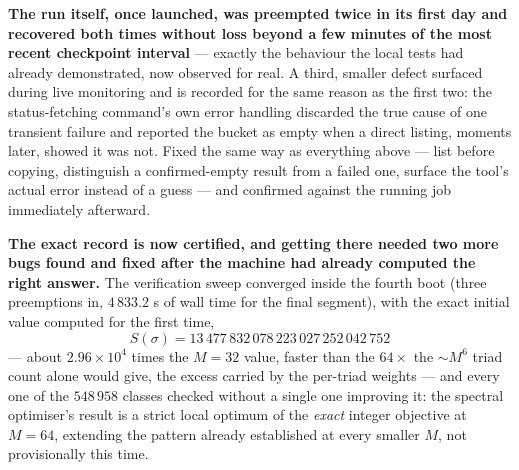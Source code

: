 \documentclass[11pt,a4paper]{article}
\theoremstyle{definition}
\theoremstyle{plain}
\begin{document}
\textbf{The run itself, once launched, was preempted twice in its first day and recovered both
times without loss beyond a few minutes of the most recent checkpoint interval} --- exactly the
behaviour the local tests had already demonstrated, now observed for real. A third, smaller
defect surfaced during live monitoring and is recorded for the same reason as the first two: the
status-fetching command's own error handling discarded the true cause of one transient failure and
reported the bucket as empty when a direct listing, moments later, showed it was not. Fixed the
same way as everything above --- list before copying, distinguish a confirmed-empty result from a
failed one, surface the tool's actual error instead of a guess --- and confirmed against the
running job immediately afterward.

\textbf{The exact record is now certified, and getting there needed two more bugs found and
fixed after the machine had already computed the right answer.} The verification sweep
converged inside the fourth boot (three preemptions in, $4\,833.2$ s of wall time for the final
segment), with the exact initial value computed for the first time,
\[
  S(\sigma) = 13\,477\,832\,078\,223\,027\,252\,042\,752
\]
--- about $2.96\times10^4$ times the $M=32$ value, faster than the $64\times$ the $\sim M^6$
triad count alone would give, the excess carried by the per-triad weights --- and every one of
the $548\,958$ classes checked without a single one improving it: the spectral
optimiser's result is a strict local optimum of the \emph{exact} integer objective at $M=64$,
extending the pattern already established at every smaller $M$, not provisionally this time.
\end{document}
